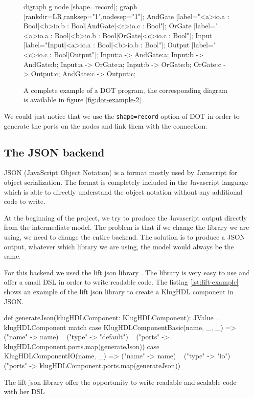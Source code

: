 \begin{figure}[H]
  \centering
  \begin{textcode}
    digraph g {
      node [shape=record];
      graph [rankdir=LR,ranksep="1",nodesep="1"];
      AndGate [label="{{<a>io.a : Bool|<b>io.b : Bool}|AndGate|{<c>io.c : Bool}}"];
      OrGate [label="{{<a>io.a : Bool|<b>io.b : Bool}|OrGate|{<c>io.c : Bool}}"];
      Input [label="{Input|{<a>io.a : Bool|<b>io.b : Bool}}"];
      Output [label="{{<c>io.c : Bool}|Output}"];
      Input:a -> AndGate:a;      Input:b -> AndGate:b;
      Input:a -> OrGate:a;       Input:b -> OrGate:b;
      OrGate:c -> Output:c;      AndGate:c -> Output:c;
    }
  \end{textcode}
  \caption[Example of a Graphviz program]{A complete example of a DOT program,
    the corresponding diagram is available in figure \ref{fig:dot-example-2}}
  \label{lst:dot-example-2}
\end{figure}

We could just notice that we use the \verb|shape=record| option of DOT in order
to generate the ports on the nodes and link them with the connection.

\subsection{The JSON backend}
\label{sec:json-backend}

JSON (JavaScript Object Notation) is a format mostly used by Javascript for
object serialization. The format is completely included in the Javascript
language which is able to directly understand the object notation without any
additional code to write.

At the beginning of the project, we try to produce the Javascript
output directly from the intermediate model. The problem is that if we change
the library we are using, we need to change the entire backend. The solution is
to produce a JSON output, whatever which library we are using, the model would
always be the same.

For this backend we used the lift json library \cite{liftweb}. The library is
very easy to use and offer a small DSL in order to write readable code. The
listing \ref{lst:lift-example} shows an example of the lift json library to create a
KlugHDL component in JSON.

\begin{listing}[H]
  \centering
  \begin{scalacode}
  def generateJson(klugHDLComponent: KlugHDLComponent): JValue = klugHDLComponent match {
    case KlugHDLComponentBasic(name, _, _) =>
      ("name" -> name) ~
      ("type" -> "default") ~
      ("ports" -> klugHDLComponent.ports.map(generateJson))
    case KlugHDLComponentIO(name, _) =>
      ("name" -> name) ~
      ("type" -> "io") ~
      ("ports" -> klugHDLComponent.ports.map(generateJson))
  }
  \end{scalacode}
  \caption[Lift library example : a json DSL]{The lift json library offer the
    opportunity to write readable and scalable code with her DSL}
  \label{lst:lift-example}
\end{listing}

